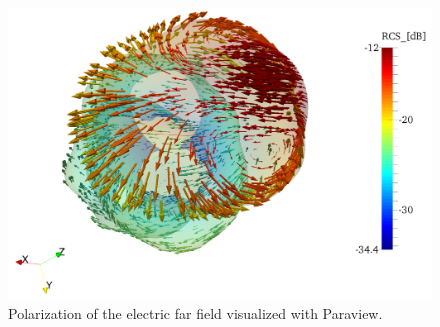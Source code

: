 \begin{figure}[h]
\centering
\includegraphics[width=12cm]{SpherePol}
\caption{Polarization of the electric far field visualized with Paraview.}
\label{fig:SpherePol}
\end{figure}